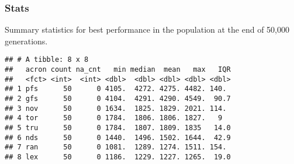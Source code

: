 \documentclass[]{book}
\newenvironment{Shaded}{\begin{snugshade}}{\end{snugshade}}
\newcommand{\DataTypeTok}[1]{\textcolor[rgb]{0.13,0.29,0.53}{#1}}
\newcommand{\KeywordTok}[1]{\textcolor[rgb]{0.13,0.29,0.53}{\textbf{#1}}}
\newcommand{\NormalTok}[1]{#1}
\newcommand{\OperatorTok}[1]{\textcolor[rgb]{0.81,0.36,0.00}{\textbf{#1}}}
\newcommand{\OtherTok}[1]{\textcolor[rgb]{0.56,0.35,0.01}{#1}}
\newcommand{\StringTok}[1]{\textcolor[rgb]{0.31,0.60,0.02}{#1}}
\begin{document}
\hypertarget{stats-1}{%
\subsubsection{Stats}\label{stats-1}}

Summary statistics for best performance in the population at the end of 50,000 generations.

\begin{Shaded}
\end{Shaded}

\begin{verbatim}
## # A tibble: 8 x 8
##   acron count na_cnt   min median  mean   max   IQR
##   <fct> <int>  <int> <dbl>  <dbl> <dbl> <dbl> <dbl>
## 1 pfs      50      0 4105.  4272. 4275. 4482. 140. 
## 2 gfs      50      0 4104.  4291. 4290. 4549.  90.7
## 3 nov      50      0 1634.  1825. 1829. 2021. 114. 
## 4 tor      50      0 1784.  1806. 1806. 1827.   9  
## 5 tru      50      0 1784.  1807. 1809. 1835   14.0
## 6 nds      50      0 1440.  1496. 1502. 1644.  42.9
## 7 ran      50      0 1081.  1289. 1274. 1511. 154. 
## 8 lex      50      0 1186.  1229. 1227. 1265.  19.0
\end{verbatim}
\end{document}

